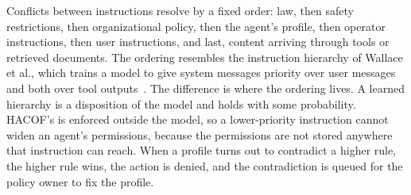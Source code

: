 \documentclass{ieeeaccess}
\newcommand{\hacof}{HACOF}
\begin{document}
Conflicts between instructions resolve by a fixed order: law, then safety restrictions, then organizational policy, then the agent's profile, then operator instructions, then user instructions, and last, content arriving through tools or retrieved documents. The ordering resembles the instruction hierarchy of Wallace et al., which trains a model to give system messages priority over user messages and both over tool outputs~\cite{wallace2024hierarchy}.
The difference is where the ordering lives. A learned hierarchy is a disposition of the model and holds with some probability. \hacof's is enforced outside the model, so a lower-priority instruction cannot widen an agent's permissions, because the permissions are not stored anywhere that instruction can reach. When a profile turns out to contradict a higher rule, the higher rule wins, the action is denied, and the contradiction is queued for the policy owner to fix the profile.
\end{document}
